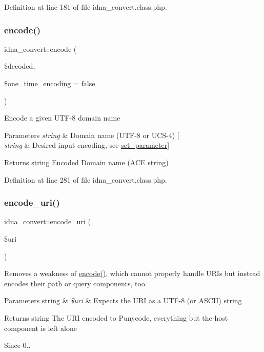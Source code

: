 Definition at line 181 of file idna\+\_\+convert.\+class.\+php.

\hypertarget{classidna__convert_ae6e83c86d02d1ad9b8a7eb48435863bd}{}\label{classidna__convert_ae6e83c86d02d1ad9b8a7eb48435863bd} 
\subsubsection{\texorpdfstring{encode()}{encode()}}
{\footnotesize\ttfamily idna\+\_\+convert\+::encode (\begin{DoxyParamCaption}\item[{}]{\$decoded,  }\item[{}]{\$one\+\_\+time\+\_\+encoding = {\ttfamily false} }\end{DoxyParamCaption})}

Encode a given U\+T\+F-\/8 domain name 
\begin{DoxyParams}{Parameters}
{\em string} & Domain name (U\+T\+F-\/8 or U\+C\+S-\/4) \mbox{[}\\
\hline
{\em string} & Desired input encoding, see \hyperlink{classidna__convert_a1efc37a8bd5f6b08eed75e0b8e6f074d}{set\+\_\+parameter}\mbox{]} \\
\hline
\end{DoxyParams}
\begin{DoxyReturn}{Returns}
string Encoded Domain name (A\+CE string) 
\end{DoxyReturn}


Definition at line 281 of file idna\+\_\+convert.\+class.\+php.

\hypertarget{classidna__convert_a21b3f0bb158b689c9d835bb1c7a30114}{}\label{classidna__convert_a21b3f0bb158b689c9d835bb1c7a30114} 
\subsubsection{\texorpdfstring{encode\+\_\+uri()}{encode\_uri()}}
{\footnotesize\ttfamily idna\+\_\+convert\+::encode\+\_\+uri (\begin{DoxyParamCaption}\item[{}]{\$uri }\end{DoxyParamCaption})}

Removes a weakness of \hyperlink{classidna__convert_ae6e83c86d02d1ad9b8a7eb48435863bd}{encode()}, which cannot properly handle U\+R\+Is but instead encodes their path or query components, too. 
\begin{DoxyParams}[1]{Parameters}
string & {\em \$uri} & Expects the U\+RI as a U\+T\+F-\/8 (or A\+S\+C\+II) string \\
\hline
\end{DoxyParams}
\begin{DoxyReturn}{Returns}
string The U\+RI encoded to Punycode, everything but the host component is left alone 
\end{DoxyReturn}
\begin{DoxySince}{Since}
0.. 
\end{DoxySince}


